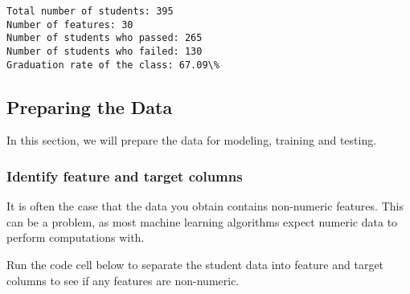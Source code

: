 \documentclass{ctexart}
\begin{document}
    \begin{Verbatim}[commandchars=\\\{\}]
Total number of students: 395
Number of features: 30
Number of students who passed: 265
Number of students who failed: 130
Graduation rate of the class: 67.09\%
    \end{Verbatim}

    \subsection{Preparing the Data}\label{preparing-the-data}

In this section, we will prepare the data for modeling, training and
testing.

\subsubsection{Identify feature and target
columns}\label{identify-feature-and-target-columns}

It is often the case that the data you obtain contains non-numeric
features. This can be a problem, as most machine learning algorithms
expect numeric data to perform computations with.

Run the code cell below to separate the student data into feature and
target columns to see if any features are non-numeric.
\end{document}

